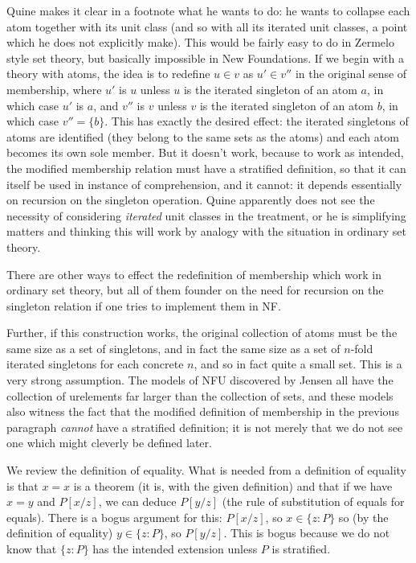 \documentclass[12pt]{article}
\begin{document}
Quine makes it clear in a footnote what he wants to do:  he wants to collapse each atom together with its unit class (and so with all its iterated unit classes, a point which he does not explicitly make).   This would be fairly easy to do in Zermelo style set theory, but basically impossible in New Foundations.  If we begin with a theory with atoms, the idea is to redefine $u \in v$ as $u' \in v''$ in the original sense of membership, where $u'$ is $u$ unless $u$ is the iterated singleton of an atom $a$, in which case $u'$ is $a$, and $v''$ is $v$ unless $v$ is the iterated singleton of an atom $b$, in which case $v'' = \{b\}$.  This has exactly the desired effect:  the iterated singletons of atoms are identified
(they belong to the same sets as the atoms) and each atom becomes its own sole member.  But it doesn't work, because to work as intended, the modified membership relation must have a stratified definition, so that it can itself be used in instance of comprehension, and it cannot:  it depends essentially on recursion on the singleton operation.  Quine apparently does not see the necessity of considering {\em iterated\/} unit classes in the treatment, or he is simplifying matters and thinking this will work by analogy with the situation in ordinary set theory.

There are other ways to effect the redefinition of membership which work in ordinary set theory, but all of them founder on the need for recursion on the singleton relation if one tries to implement them in NF.

 Further,
if this construction works, the original collection of atoms must be the same size as a set of singletons, and in fact the same size as a set of $n$-fold iterated singletons for each concrete $n$, and so in fact quite a small set.  This is a very strong assumption.  The models of NFU discovered by Jensen all have the collection of urelements far larger than the collection of sets, and these models also witness the fact that the modified definition of membership in the previous paragraph {\em cannot\/} have a stratified definition;  it is not merely that we do not see one which might cleverly be defined later.

We review the definition of equality.  What is needed from a definition of equality is that $x=x$ is a theorem (it is, with the given definition) and that if we have $x=y$ and $P[x/z]$, we can deduce $P[y/z]$ (the rule of substitution of equals for equals).  There is a bogus argument for this:  $P[x/z]$, so $x \in \{z:P\}$ so (by the definition of equality) $y \in \{z:P\}$, so $P[y/z]$.  This is bogus because we do not know that $\{z:P\}$ has the intended extension unless $P$ is stratified.
\end{document}
